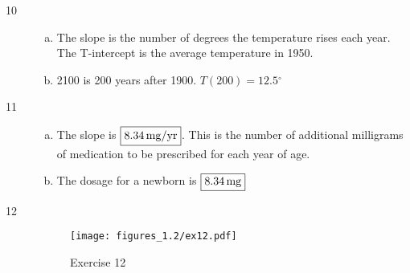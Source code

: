\documentclass[letterpaper, landscape]{exam}
\newcommand{\dg}{\ensuremath{^\circ}}
\begin{document}
\begin{description}




      \item[10] 
        \begin{enumerate}[(a)]
          \item The slope is the number of degrees the temperature rises each
            year. The T-intercept is the average temperature in 1950.

          \item 2100 is 200 years after 1900. $T(200) = \boxed{ 12.5 \dg }$
        \end{enumerate}

      \item[11] 
        \begin{enumerate}[(a)]
          \item The slope is $\boxed{ \unit[8.34]{mg/yr} }$. This is the number of
            additional milligrams of medication to be prescribed for each year
            of age.

          \item The dosage for a newborn is $\boxed{ \unit[8.34]{mg} }$
        \end{enumerate}

      \item[12] 
        \begin{figure}[H]
          \centering
          \texttt{[image: figures\_1.2/ex12.pdf]}
          \caption{Exercise 12}
          \label{fig:ex12}
        \end{figure}


\end{description}
\end{document}
